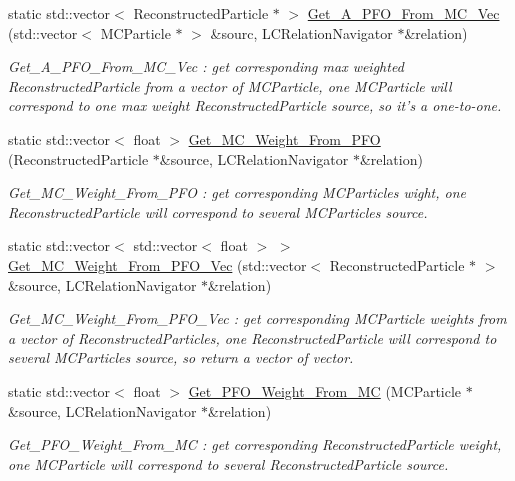 \begin{DoxyCompactItemize}
static std::vector$<$ ReconstructedParticle $\ast$ $>$ \hyperlink{classToolSet_1_1CRC_a0b26baca07714b53f86982be73121faa}{Get\_\-A\_\-PFO\_\-From\_\-MC\_\-Vec} (std::vector$<$ MCParticle $\ast$ $>$ \&sourc, LCRelationNavigator $\ast$\&relation)
\begin{DoxyCompactList}\small\item\em Get\_\-A\_\-PFO\_\-From\_\-MC\_\-Vec : get corresponding max weighted ReconstructedParticle from a vector of MCParticle, one MCParticle will correspond to one max weight ReconstructedParticle source, so it's a one-\/to-\/one. \item\end{DoxyCompactList}\item 
static std::vector$<$ float $>$ \hyperlink{classToolSet_1_1CRC_aa8c717051631a9f7e31097e458c060ad}{Get\_\-MC\_\-Weight\_\-From\_\-PFO} (ReconstructedParticle $\ast$\&source, LCRelationNavigator $\ast$\&relation)
\begin{DoxyCompactList}\small\item\em Get\_\-MC\_\-Weight\_\-From\_\-PFO : get corresponding MCParticles wight, one ReconstructedParticle will correspond to several MCParticles source. \item\end{DoxyCompactList}\item 
static std::vector$<$ std::vector$<$ float $>$ $>$ \hyperlink{classToolSet_1_1CRC_aaaca6d608e731f498833598f0c611b34}{Get\_\-MC\_\-Weight\_\-From\_\-PFO\_\-Vec} (std::vector$<$ ReconstructedParticle $\ast$ $>$ \&source, LCRelationNavigator $\ast$\&relation)
\begin{DoxyCompactList}\small\item\em Get\_\-MC\_\-Weight\_\-From\_\-PFO\_\-Vec : get corresponding MCParticle weights from a vector of ReconstructedParticles, one ReconstructedParticle will correspond to several MCParticles source, so return a vector of vector. \item\end{DoxyCompactList}\item 
static std::vector$<$ float $>$ \hyperlink{classToolSet_1_1CRC_a384a4d9c72384db38104b6c67b7b6c5d}{Get\_\-PFO\_\-Weight\_\-From\_\-MC} (MCParticle $\ast$\&source, LCRelationNavigator $\ast$\&relation)
\begin{DoxyCompactList}\small\item\em Get\_\-PFO\_\-Weight\_\-From\_\-MC : get corresponding ReconstructedParticle weight, one MCParticle will correspond to several ReconstructedParticle source. \item\end{DoxyCompactList}\item 

\end{DoxyCompactItemize}
